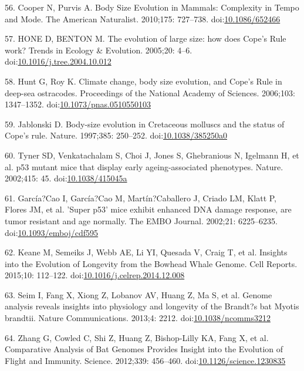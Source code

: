 \documentclass[]{elsarticle} %
\begin{document}
\leavevmode\hypertarget{ref-CooperAndPurvis2010}{}%
56. Cooper N, Purvis A. Body Size Evolution in Mammals: Complexity in Tempo and Mode. The American Naturalist. 2010;175: 727--738. doi:\href{https://doi.org/10.1086/652466}{10.1086/652466}

\leavevmode\hypertarget{ref-HoneAndBenton2004}{}%
57. HONE D, BENTON M. The evolution of large size: how does Cope's Rule work? Trends in Ecology \& Evolution. 2005;20: 4--6. doi:\href{https://doi.org/10.1016/j.tree.2004.10.012}{10.1016/j.tree.2004.10.012}

\leavevmode\hypertarget{ref-HuntAndRoy2006}{}%
58. Hunt G, Roy K. Climate change, body size evolution, and Cope's Rule in deep-sea ostracodes. Proceedings of the National Academy of Sciences. 2006;103: 1347--1352. doi:\href{https://doi.org/10.1073/pnas.0510550103}{10.1073/pnas.0510550103}

\leavevmode\hypertarget{ref-Jablonski1997}{}%
59. Jablonski D. Body-size evolution in Cretaceous molluscs and the status of Cope's rule. Nature. 1997;385: 250--252. doi:\href{https://doi.org/10.1038/385250a0}{10.1038/385250a0}

\leavevmode\hypertarget{ref-Tyner:20021c2}{}%
60. Tyner SD, Venkatachalam S, Choi J, Jones S, Ghebranious N, Igelmann H, et al. p53 mutant mice that display early ageing-associated phenotypes. Nature. 2002;415: 45. doi:\href{https://doi.org/10.1038/415045a}{10.1038/415045a}

\leavevmode\hypertarget{ref-GarciaCao:20021c2}{}%
61. García?Cao I, García?Cao M, Martín?Caballero J, Criado LM, Klatt P, Flores JM, et al. 'Super p53' mice exhibit enhanced DNA damage response, are tumor resistant and age normally. The EMBO Journal. 2002;21: 6225--6235. doi:\href{https://doi.org/10.1093/emboj/cdf595}{10.1093/emboj/cdf595}

\leavevmode\hypertarget{ref-BowheadGenome}{}%
62. Keane M, Semeiks J, Webb AE, Li YI, Quesada V, Craig T, et al. Insights into the Evolution of Longevity from the Bowhead Whale Genome. Cell Reports. 2015;10: 112--122. doi:\href{https://doi.org/10.1016/j.celrep.2014.12.008}{10.1016/j.celrep.2014.12.008}

\leavevmode\hypertarget{ref-seim2013}{}%
63. Seim I, Fang X, Xiong Z, Lobanov AV, Huang Z, Ma S, et al. Genome analysis reveals insights into physiology and longevity of the Brandt?s bat Myotis brandtii. Nature Communications. 2013;4: 2212. doi:\href{https://doi.org/10.1038/ncomms3212}{10.1038/ncomms3212}

\leavevmode\hypertarget{ref-myoDav1_pteAle1}{}%
64. Zhang G, Cowled C, Shi Z, Huang Z, Bishop-Lilly KA, Fang X, et al. Comparative Analysis of Bat Genomes Provides Insight into the Evolution of Flight and Immunity. Science. 2012;339: 456--460. doi:\href{https://doi.org/10.1126/science.1230835}{10.1126/science.1230835}
\end{document}
